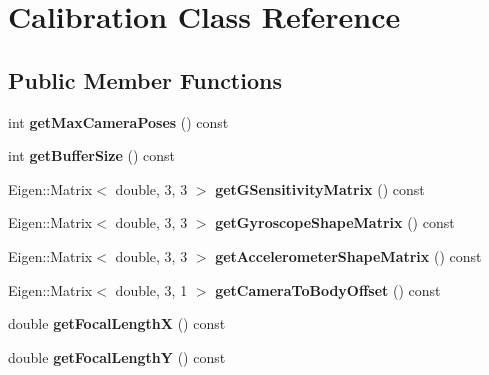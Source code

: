 \hypertarget{class_calibration}{\section{Calibration Class Reference}
\label{class_calibration}
}
\subsection*{Public Member Functions}
\begin{DoxyCompactItemize}
\item 
\hypertarget{class_calibration_a0273a577bae64d0833262103580e4a38}{int {\bfseries get\-Max\-Camera\-Poses} () const }\label{class_calibration_a0273a577bae64d0833262103580e4a38}

\item 
\hypertarget{class_calibration_acdf5d45d605b29f9114ae05600f07b76}{int {\bfseries get\-Buffer\-Size} () const }\label{class_calibration_acdf5d45d605b29f9114ae05600f07b76}

\item 
\hypertarget{class_calibration_ad3edc4101a92835c6eed1dcfa004b592}{Eigen\-::\-Matrix$<$ double, 3, 3 $>$ {\bfseries get\-G\-Sensitivity\-Matrix} () const }\label{class_calibration_ad3edc4101a92835c6eed1dcfa004b592}

\item 
\hypertarget{class_calibration_a645b1a1cd460d493756669392ac71b78}{Eigen\-::\-Matrix$<$ double, 3, 3 $>$ {\bfseries get\-Gyroscope\-Shape\-Matrix} () const }\label{class_calibration_a645b1a1cd460d493756669392ac71b78}

\item 
\hypertarget{class_calibration_acd1d1fff6512b6fbfa8ff80cd45033f3}{Eigen\-::\-Matrix$<$ double, 3, 3 $>$ {\bfseries get\-Accelerometer\-Shape\-Matrix} () const }\label{class_calibration_acd1d1fff6512b6fbfa8ff80cd45033f3}

\item 
\hypertarget{class_calibration_a1144bc436545a52c5036ba6b02028c78}{Eigen\-::\-Matrix$<$ double, 3, 1 $>$ {\bfseries get\-Camera\-To\-Body\-Offset} () const }\label{class_calibration_a1144bc436545a52c5036ba6b02028c78}

\item 
\hypertarget{class_calibration_ab8e718f8167cbc0d15cb90983175ce9d}{double {\bfseries get\-Focal\-Length\-X} () const }\label{class_calibration_ab8e718f8167cbc0d15cb90983175ce9d}

\item 
\hypertarget{class_calibration_af25283fd143f9f8e4026afadff66188f}{double {\bfseries get\-Focal\-Length\-Y} () const }\label{class_calibration_af25283fd143f9f8e4026afadff66188f}


\end{DoxyCompactItemize}
